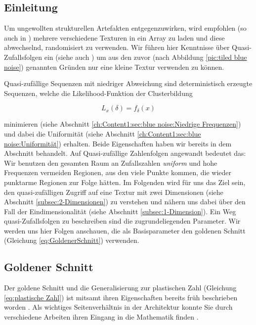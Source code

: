 \subsection{Einleitung}

Um ungewollten strukturellen Artefakten entgegenzuwirken, wird empfohlen (so auch in \cite{bluenoisechrisschied})
mehrere verschiedene  Texturen in ein Array zu laden 
und diese abwechselnd, randomisiert zu verwenden. Wir führen hier Kenntnisse über  
Quasi-Zufallsfolgen ein (siehe auch \cite{quasirandomsequencesbyRoberts}) um aus den zuvor 
(nach Abbildung \ref{pic:tiled blue noise}) genannten Gründen nur eine kleine 
Textur verwenden zu können. \par
Quasi-zufällige Sequenzen mit niedriger Abweichung sind deterministisch 
erzeugte Sequenzen, welche die Likelihood-Funktion der Clusterbildung

\begin{equation}\label{eq:Likeli-Hood-Gleichung}
    L_{x}(\delta) = f_{\delta}(x)
\end{equation}

minimieren (siehe Abschnitt \ref{ch:Content1:sec:blue noise:Niedrige Frequenzen}) und dabei die 
Uniformität (siehe Abschnitt \ref{ch:Content1:sec:blue noise:Uniformität}) erhalten. Beide Eigenschaften 
haben wir bereits in dem  Abschnitt behandelt.
Auf Quasi-zufällige Zahlenfolgen angewandt bedeutet das: Wir benutzen den gesamten Raum an Zufallszahlen
\textit{uniform} und hohe Frequenzen vermeiden Regionen, aus den viele Punkte kommen, die wieder 
punktarme Regionen zur Folge hätten.   
Im Folgenden wird für uns das Ziel sein, den quasi-zufälligen Zugriff auf eine Textur 
mit zwei Dimensionen (siehe Abschnitt \ref{subsec:2-Dimensionen}) zu verstehen und nähern 
uns dabei über den Fall der Eindimensionalität (siehe Abschnitt \ref{subsec:1-Dimension}).
Ein Weg quasi-Zufallsfolgen zu beschreiben sind die zugrundeliegenden Parameter. 
Wir werden uns hier Folgen anschauen, die als Basisparameter den 
goldenen Schnitt (Gleichung \ref{eq:GoldenerSchnitt}) verwenden.

\subsection{Goldener Schnitt}

Der goldene Schnitt und die Generalisierung zur plastischen Zahl (Gleichung \ref{eq:plastische Zahl})
ist mitsamt ihren Eigenschaften bereits früh beschrieben worden \cite{vanderlaanplasticnumber}.
Als wichtiges Seitenverhältnis in der Architektur konnte Sie durch verschiedene Arbeiten ihren 
Eingang in die Mathematik finden \cite{krcadinac2006new}.

